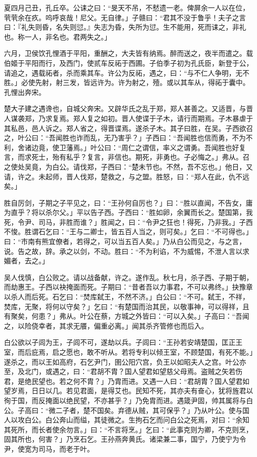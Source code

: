 \documentclass[]{article}
\begin{document}
夏四月己丑，孔丘卒。公诔之曰：``旻天不吊，不憖遗一老。俾屏余一人以在位，茕茕余在疚。呜呼哀哉！尼父。无自律。」子赣曰：``君其不没于鲁乎！夫子之言曰：『礼失则昏，名失则愆。』失志为昏，失所为愆。生不能用，死而诔之，非礼也。称一人，非名也。君两失之。」

六月，卫侯饮孔悝酒于平阳，重酬之，大夫皆有纳焉。醉而送之，夜半而遣之。载伯姬于平阳而行，及西门，使贰车反祏于西圃。子伯季子初为孔氏臣，新登于公，请追之，遇载祏者，杀而乘其车。许公为反祏，遇之，曰：``与不仁人争明，无不胜。」必使先射，射三发，皆远许为。许为射之，殪。或以其车从，得祏于囊中。孔悝出奔宋。

楚大子建之遇谗也，自城父奔宋。又辟华氏之乱于郑，郑人甚善之。又适晋，与晋人谋袭郑，乃求复焉。郑人复之如初。晋人使谍于子木，请行而期焉。子木暴虐于其私邑，邑人诉之。郑人省之，得晋谍焉。遂杀子木。其子曰胜，在吴。子西欲召之，叶公曰：``吾闻胜也诈而乱，无乃害乎？」子西曰：``吾闻胜也信而勇，不为不利，舍诸边竟，使卫藩焉。」叶公曰：``周仁之谓信，率义之谓勇。吾闻胜也好复言，而求死士，殆有私乎？复言，非信也。期死，非勇也。子必悔之。」弗从。召之使处吴竟，为白公。请伐郑，子西曰：``楚未节也。不然，吾不忘也。」他日，又请，许之。未起师，晋人伐郑，楚救之，与之盟。胜怒，曰：``郑人在此，仇不远矣。」

胜自厉剑，子期之子平见之，曰：``王孙何自厉也？」曰：``胜以直闻，不告女，庸为直乎？将以杀尔父。」平以告子西。子西曰：``胜如卵，余翼而长之。楚国第，我死，令尹、司马，非胜而谁？」胜闻之，曰：``令尹之狂也！得死，乃非我。」子西不悛。胜谓石乞曰：``王与二卿士，皆五百人当之，则可矣。」乞曰：``不可得也。」曰：``市南有熊宜僚者，若得之，可以当五百人矣。」乃从白公而见之，与之言，说。告之故，辞。承之以剑，不动。胜曰：``不为利谄，不为威惕，不泄人言以求媚者，去之。」

吴人伐慎，白公败之。请以战备献，许之。遂作乱。秋七月，杀子西、子期于朝，而劫惠王。子西以袂掩面而死。子期曰：``昔者吾以力事君，不可以弗终。」抉豫章以杀人而后死。石乞曰：``焚库弑王，不然不济。」白公曰：``不可。弑王，不祥，焚库，无聚，将何以守矣？」乞曰：``有楚国而治其民，以敬事神，可以得祥，且有聚矣，何患？」弗从。叶公在蔡，方城之外皆曰：``可以入矣。」子高曰：``吾闻之，以险侥幸者，其求无餍，偏重必离。」闻其杀齐管修也而后入。

白公欲以子闾为王，子闾不可，遂劫以兵。子闾曰：``王孙若安靖楚国，匡正王室，而后庇焉，启之愿也，敢不听从。若将专利以倾王室，不顾楚国，有死不能。」遂杀之，而以王如高府，石乞尹门，圉公阳穴宫，负王以如昭夫人之宫。叶公亦至，及北门，或遇之，曰：``君胡不胄？国人望君如望慈父母焉。盗贼之矢若伤君，是绝民望也。若之何不胄？」乃胄而进。又遇一人曰：``君胡胄？国人望君如望岁焉，日日以几。若见君面，是得艾也。民知不死，其亦夫有奋心，犹将旌君以徇于国，而反掩面以绝民望，不亦甚乎？」乃免胄而进。遇箴尹固，帅其属将与白公。子高曰：``微二子者，楚不国矣。弃德从贼，其可保乎？」乃从叶公。使与国人以攻白公。白公奔山而缢，其徒微之。生拘石乞而问白公之死焉，对曰：``余知其死所，而长者使余勿言。」曰：``不言将烹。」乞曰：``此事克则为卿，不克则烹，固其所也，何害？」乃烹石乞。王孙燕奔黄氏。诸梁兼二事，国宁，乃使宁为令尹，使宽为司马，而老于叶。
\end{document}
